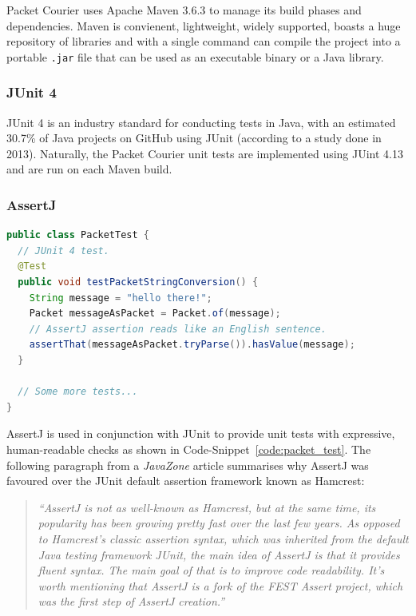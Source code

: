 Packet Courier uses Apache Maven 3.6.3\cite{maven} to manage its build phases and dependencies. Maven is convienent,
lightweight, widely supported, boasts a huge repository of libraries\cite{maven_repository} and with a single
command can compile the project into a portable \texttt{.jar} file that can be used as an executable binary or a Java
library.

\subsubsection{JUnit 4}

JUnit 4\cite{juint4} is an industry standard for conducting tests in Java, with an estimated 30.7\% of Java projects on
GitHub using JUnit (according to a study done in 2013)\cite{java_library_popularity}. Naturally, the Packet Courier
unit tests are implemented using JUint 4.13 and are run on each Maven build.

\subsubsection{AssertJ}

\begin{lstlisting}[language=Java,caption={An example of a Packet Courier unit test using JUnit and AssertJ.},
    label={code:packet_test},captionpos=b]
public class PacketTest {
  // JUnit 4 test.
  @Test
  public void testPacketStringConversion() {
    String message = "hello there!";
    Packet messageAsPacket = Packet.of(message);
    // AssertJ assertion reads like an English sentence.
    assertThat(messageAsPacket.tryParse()).hasValue(message);
  }

  // Some more tests...
}
\end{lstlisting}


AssertJ\cite{assert_j} is used in conjunction with JUnit to provide unit tests with expressive, human-readable checks
as shown in Code-Snippet~\ref{code:packet_test}. The following paragraph from a \emph{JavaZone} article summarises
why AssertJ was favoured over the JUnit default assertion framework known as Hamcrest\cite{assert_j_vs_hamcrest}:
\begin{quote}
    \emph{``AssertJ is not as well-known as Hamcrest, but at the same time, its popularity has been growing pretty
    fast over the last few years. As opposed to Hamcrest’s classic assertion syntax, which was inherited from the
    default Java testing framework JUnit, the main idea of AssertJ is that it provides fluent syntax. The main goal
    of that is to improve code readability. It’s worth mentioning that AssertJ is a fork of the FEST Assert project,
        which was the first step of AssertJ creation.''}
\end{quote}

